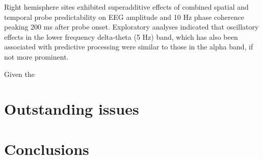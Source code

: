 \documentclass[dwyatte_dissertation.tex]{subfiles}
\begin{document}
Right hemisphere sites exhibited superadditive effects of combined spatial and temporal probe predictability on EEG amplitude and 10 Hz phase coherence peaking 200 ms after probe onset. Exploratory analyses indicated that oscillatory effects in the lower frequency delta-theta (5 Hz) band, which has also been associated with predictive processing \cite{ArnalGiraud12,GiraudPoeppel12} were similar to those in the alpha band, if not more prominent. 

Given the 

\section{Outstanding issues}



%
%

\section{Conclusions}



\end{document}
